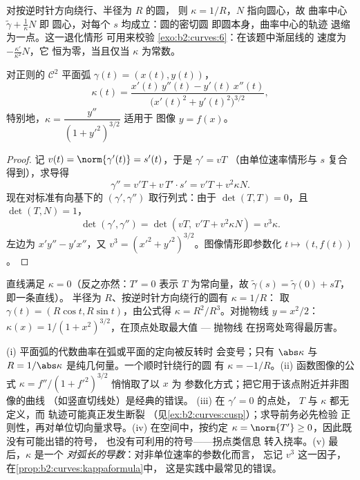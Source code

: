 \begin{example}\label{ex:b2:curves:circleevolute}
对按逆时针方向绕行、半径为 $R$ 的圆，
则 $\kappa = 1/R$，$N$ 指向圆心，故
曲率中心 $\tilde\gamma + \frac1\kappa N$ 即
圆心，对每个 $s$ 均成立：圆的密切圆
即圆本身，曲率中心的轨迹
退缩为一点。这一退化情形
可用来校验 \cref{exo:b2:curves:6}：在该题中渐屈线的
速度为 $-\frac{\kappa'}{\kappa^2}N$，它
恒为零，当且仅当 $\kappa$ 为常数。
\end{example}

\begin{proposition}\label{prop:b2:curves:kappaformula}
对正则的 $\mathcal{C}^2$ 平面弧 $\gamma(t) = (x(t), y(t))$，
\[
\kappa(t)
= \frac{x'(t)\,y''(t) - y'(t)\,x''(t)}
       {\bigl(x'(t)^2 + y'(t)^2\bigr)^{3/2}} ,
\]
特别地，$\kappa = \dfrac{y''}{(1 + y'^2)^{3/2}}$ 适用于
图像 $y = f(x)$。
\end{proposition}

\begin{proof}
记 $v(t) = \norm{\gamma'(t)} = s'(t)$，于是 $\gamma' = vT$
（由单位速率情形与 $s$ 复合得到），求导得
\[
\gamma'' = v'T + v\,T'\cdot s' = v'T + v^2\kappa N .
\]
现在对标准有向基下的
$(\gamma', \gamma'')$ 取行列式：由于 $\det(T, T) = 0$，且 $\det(T, N) = 1$，
\[
\det(\gamma', \gamma'') = \det(vT,\ v'T + v^2\kappa N)
= v^3\kappa .
\]
左边为 $x'y'' - y'x''$，又 $v^3 = (x'^2 +
y'^2)^{3/2}$。图像情形即参数化 $t \mapsto (t,
f(t))$。
\end{proof}

\begin{example}[圆、直线、抛物线]\label{ex:b2:curves:kappaexamples}
直线满足 $\kappa = 0$（反之亦然：$T' = 0$ 表示 $T$
为常向量，故 $\tilde\gamma(s) = \tilde\gamma(0) + sT$，即一条直线）。
半径为 $R$、按逆时针方向绕行的圆有 $\kappa = 1/R$：
取 $\gamma(t) = (R\cos t, R\sin t)$，由公式得 $\kappa =
R^2/R^3$。对抛物线 $y = x^2/2$：$\kappa(x) = 1/(1 +
x^2)^{3/2}$，在顶点处取最大值 --- 抛物线
在拐弯处弯得最厉害。
\end{example}

\begin{remark}[曲率的常见误区]
(i) 平面弧的代数曲率在弧或平面的定向被反转时
会变号；只有 $\abs\kappa$ 与 $R = 1/\abs\kappa$
是纯几何量。一个顺时针绕行的圆
有 $\kappa = -1/R$。(ii) 函数图像的公式
$\kappa = f''/(1 + f'^2)^{3/2}$ 悄悄取了以 $x$ 为
参数化方式；把它用于该点附近并非图像的曲线
（如竖直切线处）是经典的错误。
(iii) 在 $\gamma' = 0$ 的点处，
$T$ 与 $\kappa$ 都无定义，而
轨迹可能真正发生断裂
（见\cref{ex:b2:curves:cusp}）；求导前务必先检验
正则性，再对单位切向量求导。(iv) 在空间中，按约定 $\kappa =
\norm{T'} \geq 0$，因此既没有可能出错的符号，
也没有可利用的符号——拐点类信息
转入挠率。(v) 最后，$\kappa$ 是一个
\emph{对弧长的导数}：对非单位速率的参数化而言，
忘记 $v^3$ 这一因子，
在\cref{prop:b2:curves:kappaformula}中，
这是实践中最常见的错误。
\end{remark}

